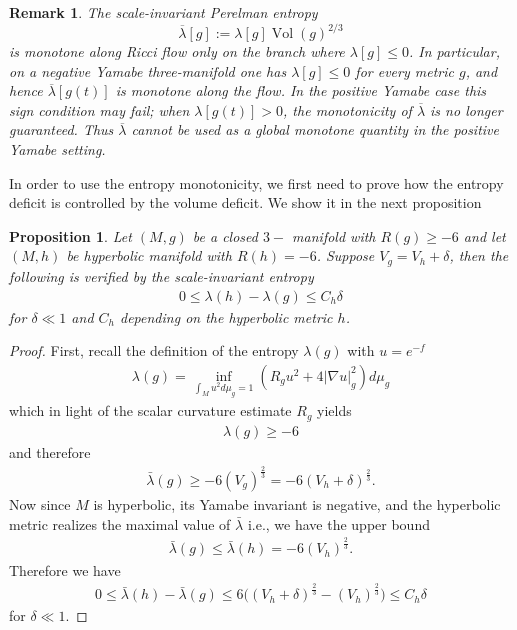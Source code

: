\documentclass{amsart}
\newtheorem{remark}{Remark}
\newtheorem{proposition}{Proposition}[section]
\begin{document}
\begin{remark}
The scale-invariant Perelman entropy
\[
        \overline{\lambda}[g]
        :=
        \lambda[g]\operatorname{Vol}(g)^{2/3}
\]
is monotone along Ricci flow only on the branch where
\(\lambda[g]\leq 0\).  In particular, on a negative Yamabe
three-manifold one has \(\lambda[g]\leq0\) for every metric \(g\), and hence
\(\overline{\lambda}[g(t)]\) is monotone along the flow.  In the positive
Yamabe case this sign condition may fail; when \(\lambda[g(t)]>0\), the
monotonicity of \(\overline{\lambda}\) is no longer guaranteed.  Thus
\(\overline{\lambda}\) cannot be used as a global monotone quantity in the
positive Yamabe setting.
\end{remark}




\noindent In order to use the entropy monotonicity, we first need to prove how the entropy deficit is controlled by the volume deficit. We show it in the next proposition 
\begin{proposition}
\label{entropydeficit}
 Let $(M,g)$ be a closed $3-$ manifold with $R(g)\geq -6$ and let $(M,h)$ be hyperbolic manifold with $R(h)=-6$. Suppose $V_{g}=V_{h}+\delta$, then the following is verified by the scale-invariant entropy 
 \begin{eqnarray}
  0\leq \lambda(h)-\lambda(g)  \leq C_{h}\delta 
 \end{eqnarray}
 for $\delta\ll 1$ and $C_{h}$ depending on the hyperbolic metric $h$.
\end{proposition}
\begin{proof}
First, recall the definition of the entropy $\lambda(g)$ with $u=e^{-f}$
\begin{eqnarray}
 \lambda(g)=\inf_{\int_{M}u^{2}d\mu_{g}=1}(R_{g}u^{2}+4|\nabla u|^{2}_{g})d\mu_{g}   
\end{eqnarray}
which in light of the scalar curvature estimate $R_{g}$ yields 
\begin{align}
  \lambda(g)\geq -6  
\end{align}
and therefore 
\begin{eqnarray}
  \bar{\lambda}(g)\geq -6(V_{g})^{\frac{2}{3}}=-6(V_{h}+\delta)^{\frac{2}{3}}.  
\end{eqnarray}
Now since \(M\) is hyperbolic, its Yamabe invariant is negative, and the hyperbolic metric realizes the maximal value of \(\bar\lambda\) i.e., we have the upper bound 
\begin{align}
    \bar\lambda(g)\leq \bar\lambda(h)=-6(V_{h})^{\frac{2}{3}}. 
\end{align}
Therefore we have 
\begin{align}
    0\leq \bar\lambda(h)-\bar\lambda(g)\leq 6\bigg((V_{h}+\delta)^{\frac{2}{3}}-(V_{h})^{\frac{2}{3}}\bigg)\leq C_{h}\delta 
\end{align}
for $\delta\ll 1$.
\end{proof}
\end{document}
